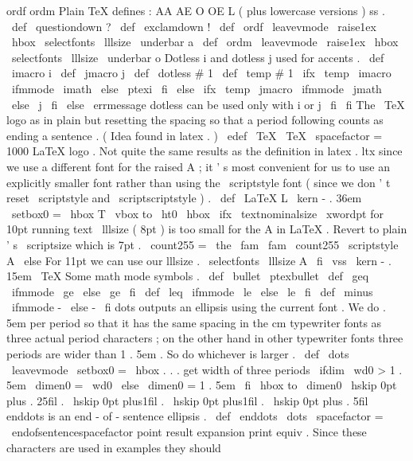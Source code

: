 {{{ordf
ordm
%
Plain
TeX
defines
:
AA
AE
O
OE
L
(
plus
lowercase
versions
)
ss
.
\
def
\
questiondown
{
?
}
\
def
\
exclamdown
{
!
}
\
def
\
ordf
{
\
leavevmode
\
raise1ex
\
hbox
{
\
selectfonts
\
lllsize
\
underbar
{
a
}
}
}
\
def
\
ordm
{
\
leavevmode
\
raise1ex
\
hbox
{
\
selectfonts
\
lllsize
\
underbar
{
o
}
}
}
%
Dotless
i
and
dotless
j
used
for
accents
.
\
def
\
imacro
{
i
}
\
def
\
jmacro
{
j
}
\
def
\
dotless
#
1
{
%
\
def
\
temp
{
#
1
}
%
\
ifx
\
temp
\
imacro
\
ifmmode
\
imath
\
else
\
ptexi
\
fi
\
else
\
ifx
\
temp
\
jmacro
\
ifmmode
\
jmath
\
else
\
j
\
fi
\
else
\
errmessage
{
dotless
can
be
used
only
with
i
or
j
}
%
\
fi
\
fi
}
%
The
\
TeX
{
}
logo
as
in
plain
but
resetting
the
spacing
so
that
a
%
period
following
counts
as
ending
a
sentence
.
(
Idea
found
in
latex
.
)
%
\
edef
\
TeX
{
\
TeX
\
spacefactor
=
1000
}
%
LaTeX
{
}
logo
.
Not
quite
the
same
results
as
the
definition
in
%
latex
.
ltx
since
we
use
a
different
font
for
the
raised
A
;
it
'
s
most
%
convenient
for
us
to
use
an
explicitly
smaller
font
rather
than
using
%
the
\
scriptstyle
font
(
since
we
don
'
t
reset
\
scriptstyle
and
%
\
scriptscriptstyle
)
.
%
\
def
\
LaTeX
{
%
L
\
kern
-
.
36em
{
\
setbox0
=
\
hbox
{
T
}
%
\
vbox
to
\
ht0
{
\
hbox
{
%
\
ifx
\
textnominalsize
\
xwordpt
%
for
10pt
running
text
\
lllsize
(
8pt
)
is
too
small
for
the
A
in
LaTeX
.
%
Revert
to
plain
'
s
\
scriptsize
which
is
7pt
.
\
count255
=
\
the
\
fam
\
fam
\
count255
\
scriptstyle
A
%
\
else
%
For
11pt
we
can
use
our
lllsize
.
\
selectfonts
\
lllsize
A
%
\
fi
}
%
\
vss
}
}
%
\
kern
-
.
15em
\
TeX
}
%
Some
math
mode
symbols
.
\
def
\
bullet
{
\
ptexbullet
}
\
def
\
geq
{
\
ifmmode
\
ge
\
else
\
ge
\
fi
}
\
def
\
leq
{
\
ifmmode
\
le
\
else
\
le
\
fi
}
\
def
\
minus
{
\
ifmmode
-
\
else
-
\
fi
}
%
dots
{
}
outputs
an
ellipsis
using
the
current
font
.
%
We
do
.
5em
per
period
so
that
it
has
the
same
spacing
in
the
cm
%
typewriter
fonts
as
three
actual
period
characters
;
on
the
other
hand
%
in
other
typewriter
fonts
three
periods
are
wider
than
1
.
5em
.
So
do
%
whichever
is
larger
.
%
\
def
\
dots
{
%
\
leavevmode
\
setbox0
=
\
hbox
{
.
.
.
}
%
get
width
of
three
periods
\
ifdim
\
wd0
>
1
.
5em
\
dimen0
=
\
wd0
\
else
\
dimen0
=
1
.
5em
\
fi
\
hbox
to
\
dimen0
{
%
\
hskip
0pt
plus
.
25fil
.
\
hskip
0pt
plus1fil
.
\
hskip
0pt
plus1fil
.
\
hskip
0pt
plus
.
5fil
}
%
}
%
enddots
{
}
is
an
end
-
of
-
sentence
ellipsis
.
%
\
def
\
enddots
{
%
\
dots
\
spacefactor
=
\
endofsentencespacefactor
}
%
point
{
}
result
{
}
expansion
{
}
print
{
}
equiv
{
}
.
%
%
Since
these
characters
are
used
in
examples
they
should
}}}
